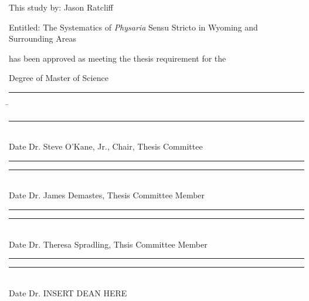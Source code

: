 \clearpage
\pagestyle{contents} %
\setcounter{page}{2}    %
This study by: Jason Ratcliff

\vspace*{20pt}

Entitled: The Systematics of \textit{Physaria} Sensu Stricto in Wyoming and Surrounding Areas

\vspace*{20pt}

has been approved as meeting the thesis requirement for the

\vspace*{20pt}

Degree of Master of Science

\vspace*{20pt}

\begin{tabbing}
\noindent\rule{2.4cm}{0.4pt} \hspace{1.33782cm} \= \rule{11.5cm}{0.4pt}\\

Date \> Dr. Steve O'Kane, Jr., Chair, Thesis Committee\\

\noindent\rule{2.4cm}{0.4pt} \hfill \> \rule{11.5cm}{0.4pt}\\

Date \> Dr. James Demastes, Thesis Committee Member\\

\noindent\rule{2.4cm}{0.4pt} \hfill \> \rule{11.5cm}{0.4pt}\\

Date \> Dr. Theresa Spradling, Thsis Committee Member\\

\noindent\rule{2.4cm}{0.4pt} \hfill \> \rule{11.5cm}{0.4pt}\\

Date \> Dr.     INSERT DEAN HERE \\

\end{tabbing}
